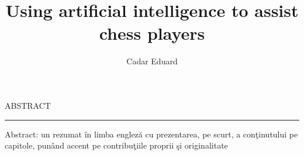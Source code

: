 \documentclass[12pt]{report}
\begin{document}
\title{Using artificial intelligence to assist chess players}
\author{Cadar Eduard}

\maketitle

\newpage
\thispagestyle{empty}
\mbox{}
\newpage
{} 

\cleardoublepage
ABSTRACT
\vspace{0.5cm}	
\hrule
\vspace{0.5cm}	

Abstract: un rezumat \^{i}n limba englez\u{a} cu prezentarea, pe scurt, a con\c{t}inutului pe capitole, pun\^{a}nd accent pe contribu\c{t}iile proprii \c{s}i originalitate

\tableofcontents

\newpage
{}











\end{document}
